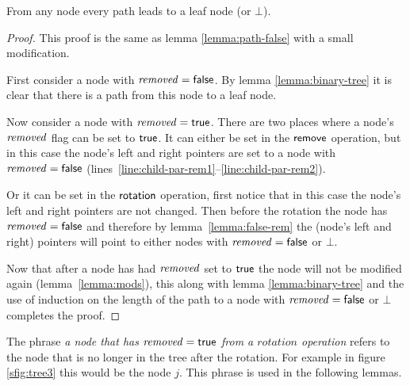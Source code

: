 \begin{lemma}
\label{lemma:path}
From any node every path leads to a leaf node (or $\bot$).
\end{lemma}
\begin{proof}
This proof is the same as lemma \ref{lemma:path-false} with a small modification.

First consider a node with $\ms{removed}=\lit{false}$.
By lemma \ref{lemma:binary-tree} 
it is clear that there is a path from this node to a leaf node.

Now consider a node with $\ms{removed}=\lit{true}$.
There are two places where a node's $\ms{removed}$ flag can be set to $\lit{true}$.
It can either be set in the $\act{remove}$ operation, but in this case the node's left and right pointers  are set to a node with $\ms{removed}=\lit{false}$ (lines~\ref{line:child-par-rem1}--\ref{line:child-par-rem2}).

Or it can be set in the $\act{rotation}$ operation, first notice that in this case the node's left and right pointers are not changed.
Then before the rotation the node has $\ms{removed}=\lit{false}$ and therefore by lemma~\ref{lemma:false-rem} the (node's left and right) pointers will point
to either nodes with $\ms{removed}=\lit{false}$ or $\bot$.

Now that after a node has had $\ms{removed}$ set to $\lit{true}$ the node will not be modified again (lemma~\ref{lemma:mods}), this along with lemma \ref{lemma:binary-tree} and
the use of induction on the length of the path to a node with $\ms{removed}=\lit{false}$ or $\bot$ completes the proof.
\end{proof}

The phrase \emph{a node that has $\ms{removed}=\lit{true}$ from a $rotation$ operation} refers to the node that is no longer in the tree after the rotation.
For example in figure \ref{sfig:tree3} this would be the node $j$.
This phrase is used in the following lemmas.

